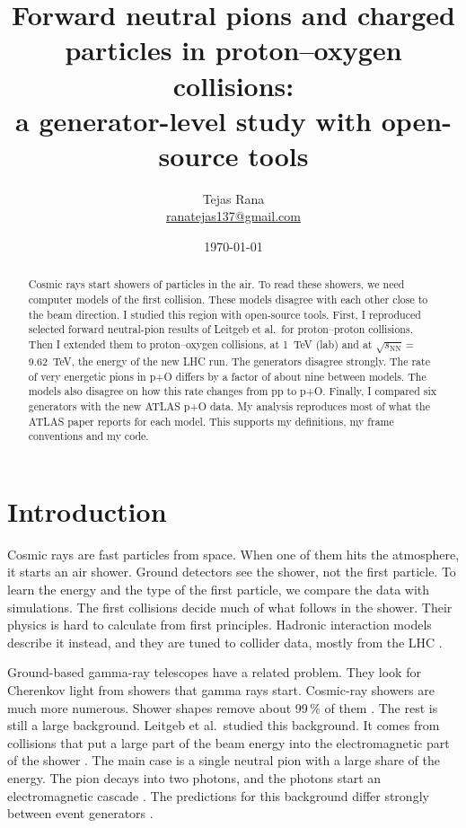 \documentclass[11pt,a4paper]{article}
\title{\textbf{Forward neutral pions and charged particles in proton--oxygen collisions:\\
a generator-level study with open-source tools}}
\author{Tejas Rana\\
\small \href{mailto:ranatejas137@gmail.com}{ranatejas137@gmail.com}}
\date{\today}
\newcommand{\sNN}{\ensuremath{\sqrt{s_{\mathrm{NN}}}}}
\begin{document}
\maketitle

\begin{abstract}
\noindent
Cosmic rays start showers of particles in the air.
To read these showers, we need computer models of the first collision.
These models disagree with each other close to the beam direction.
I studied this region with open-source tools.
First, I reproduced selected forward neutral-pion results of Leitgeb et al.\ for proton--proton collisions.
Then I extended them to proton--oxygen collisions, at 1~TeV (lab) and at \sNN\,=\,9.62~TeV, the energy of the new LHC run.
The generators disagree strongly.
The rate of very energetic pions in p+O differs by a factor of about nine between models.
The models also disagree on how this rate changes from pp to p+O.
Finally, I compared six generators with the new ATLAS p+O data.
My analysis reproduces most of what the ATLAS paper reports for each model.
This supports my definitions, my frame conventions and my code.
\end{abstract}

\section{Introduction}
Cosmic rays are fast particles from space.
When one of them hits the atmosphere, it starts an air shower.
Ground detectors see the shower, not the first particle.
To learn the energy and the type of the first particle, we compare the data with simulations.
The first collisions decide much of what follows in the shower.
Their physics is hard to calculate from first principles.
Hadronic interaction models describe it instead, and they are tuned to collider data, mostly from the LHC \cite{ATLAS:2026po,dEnterria:2011lhc,Albrecht:2026tuning}.

Ground-based gamma-ray telescopes have a related problem.
They look for Cherenkov light from showers that gamma rays start.
Cosmic-ray showers are much more numerous.
Shower shapes remove about 99\,\% of them \cite{Leitgeb:2025prd}.
The rest is still a large background.
Leitgeb et al.\ studied this background.
It comes from collisions that put a large part of the beam energy into the electromagnetic part of the shower \cite{Leitgeb:2025dis}.
The main case is a single neutral pion with a large share of the energy.
The pion decays into two photons, and the photons start an electromagnetic cascade \cite{Matthews:2005heitler}.
The predictions for this background differ strongly between event generators \cite{Leitgeb:2025dis}.
\end{document}

